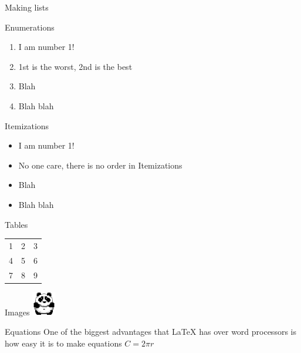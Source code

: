 \documentclass{article}
\begin{document}
\begin{section}{Making lists}

  \begin{subsection}{Enumerations}
    \begin{enumerate}
      \item{I am number 1!}
      \item{1st is the worst, 2nd is the best}
      \item{Blah}
      \item{Blah blah}
    \end{enumerate}
  \end{subsection}

  \begin{subsection}{Itemizations}
    \begin{itemize}
      \item{I am number 1!}
      \item{No one care, there is no order in Itemizations}
      \item{Blah}
      \item{Blah blah}
    \end{itemize}
  \end{subsection}

  \begin{subsection}{Tables}
    \begin{tabular}{ l c r }
      1 & 2 & 3 \\
      4 & 5 & 6 \\
      7 & 8 & 9 \\
    \end{tabular}
  \end{subsection}

  \begin{subsection}{Images}
    \includegraphics[width=40px]{./panda_icon.png}
  \end{subsection}

  \begin{subsection}{Equations}
    One of the biggest advantages that {\LaTeX} has over word processors is how
    easy it is to make equations
    $ C = 2 \pi r$


\end{subsection}
\end{section}
\end{document}
